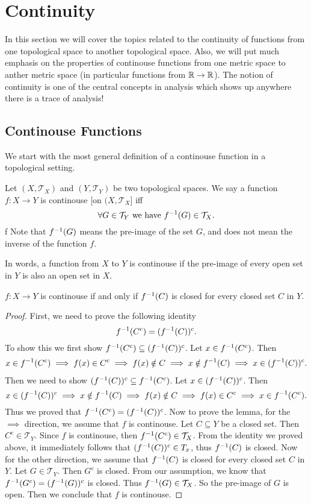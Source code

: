 \chapter{Continuity}
In this section we will cover the topics related to the continuity of functions from one topological space to another topological space. Also, we will put much emphasis on the properties of continouse functions from one metric space to anther metric space (in particular functions from $\mathbb{R} \to \mathbb{R}$). The notion of continuity is one of the central concepts in analysis which shows up anywhere there is a trace of analysis!

\section{Continouse Functions}
We start with the most general definition of a continouse function in a topological setting.

\begin{definition}
	Let $(X,\mathcal{T}_X)$ and $(Y,\mathcal{T}_Y)$ be two topological spaces. We say a function $f: X \to Y$ is continouse [on $(X,\mathcal{T}_X$] iff
	\[ \forall G \in \mathcal{T}_Y \ \text{we have}\  f^{-1}(G) \in \mathcal{T}_X. \]f
	Note that $f^{-1}(G)$ means the pre-image of the set $G$, and does not mean the inverse of the function $f$.
\end{definition}
In words, a function from $X$ to $Y$ is continouse if the pre-image of every open set in $Y$ is also an open set in $X$. 

\begin{lemma}
	$f: X \to Y$ is continouse if and only if $f^{-1}(C)$ is closed for every closed set $C$ in $Y$.
\end{lemma}

\begin{proof}
	First, we need to prove the following identity
	\[ f^{-1}(C^c) = (f^{-1}(C))^c. \]
	To show this we first show $f^{-1}(C^c) \subseteq (f^{-1}(C))^c$. Let $x \in f^{-1}(C^c)$. Then
	\begin{align*}
		x \in f^{-1}(C^c) \implies f(x) \in C^c \implies f(x) \notin C \implies x \notin f^{-1}(C) \implies x \in (f^{-1}(C))^c.
	\end{align*}
	Then we need to show $ (f^{-1}(C))^c \subseteq f^{-1}(C^c) $. Let $x\in(f^{-1}(C))^c$. Then 
	\[ x\in(f^{-1}(C))^c \implies x \notin f^{-1}(C) \implies f(x)\notin C \implies f(x) \in C^c \implies x \in f^{-1}(C^c). \]
	Thus we proved that $f^{-1}(C^c) = (f^{-1}(C))^c$. Now to prove the lemma, for the $\implies$ direction, we assume that $f$ is continouse. Let $C \subseteq Y$ be a closed set. Then $C^c \in \mathcal{T}_Y$. Since $f$ is continouse, then $f^{-1}(C^c) \in \mathcal{T}_X$. From the identity we proved above, it immediately follows that $(f^{-1}(C))^c \in T_x$, thus $f^{-1}(C)$ is closed.  Now for the other direction, we assume that $f^{-1}(C)$ is closed for every closed set $C$ in $Y$. Let $G \in \mathcal{T}_Y$. Then $G^c$ is closed. From our assumption, we know that $f^{-1}(G^c) = (f^{-1}(G))^c$ is closed. Thus $f^{-1}(G) \in \mathcal{T}_X$. So the pre-image of $G$ is open. Then we conclude that $f$ is continouse.
\end{proof}